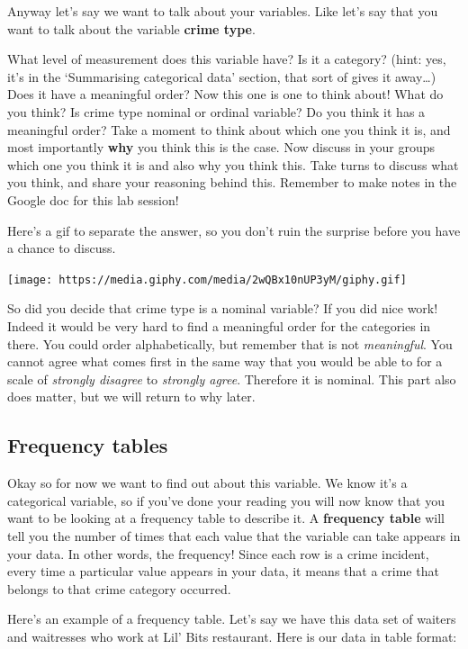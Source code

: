 \documentclass[
]{book}
\begin{document}
Anyway let's say we want to talk about your variables. Like let's say that you want to talk about the variable \textbf{crime type}.

What level of measurement does this variable have? Is it a category? (hint: yes, it's in the `Summarising categorical data' section, that sort of gives it away\ldots) Does it have a meaningful order? Now this one is one to think about! What do you think? Is crime type nominal or ordinal variable? Do you think it has a meaningful order? Take a moment to think about which one you think it is, and most importantly \textbf{why} you think this is the case. Now discuss in your groups which one you think it is and also why you think this. Take turns to discuss what you think, and share your reasoning behind this. Remember to make notes in the Google doc for this lab session!

Here's a gif to separate the answer, so you don't ruin the surprise before you have a chance to discuss.

\texttt{[image: https://media.giphy.com/media/2wQBx10nUP3yM/giphy.gif]}

So did you decide that crime type is a nominal variable? If you did nice work! Indeed it would be very hard to find a meaningful order for the categories in there. You could order alphabetically, but remember that is not \emph{meaningful}. You cannot agree what comes first in the same way that you would be able to for a scale of \emph{strongly disagree} to \emph{strongly agree}. Therefore it is nominal. This part also does matter, but we will return to why later.

\hypertarget{frequency-tables}{%
\subsection{Frequency tables}\label{frequency-tables}}

Okay so for now we want to find out about this variable. We know it's a categorical variable, so if you've done your reading you will now know that you want to be looking at a frequency table to describe it. A \textbf{frequency table} will tell you the number of times that each value that the variable can take appears in your data. In other words, the frequency! Since each row is a crime incident, every time a particular value appears in your data, it means that a crime that belongs to that crime category occurred.

Here's an example of a frequency table. Let's say we have this data set of waiters and waitresses who work at Lil' Bits restaurant. Here is our data in table format:
\end{document}
